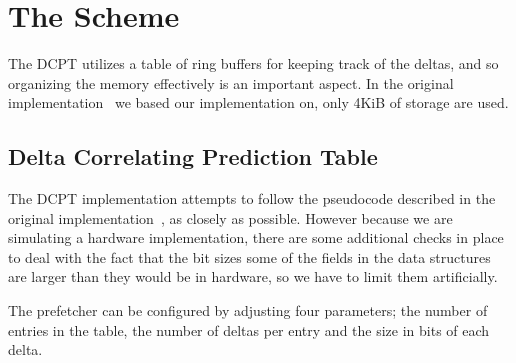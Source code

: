\section{The Scheme}


The DCPT utilizes a table of ring buffers for keeping track of the deltas, and
so organizing the memory effectively is an important aspect. In the original
implementation~\cite{dcpt} we based our implementation on, only 4KiB of storage
are used.


\subsection{Delta Correlating Prediction Table}

The DCPT implementation attempts to follow the pseudocode described in the
original implementation~\cite{dcpt}, as closely as possible. However because we
are simulating a hardware implementation, there are some additional checks in
place to deal
with the fact that the bit sizes some of the fields in the data
structures are larger than they would be in hardware, so we have to limit them
artificially.

The prefetcher can be configured by adjusting four parameters; the number of entries
in the table, the number of deltas per entry and the size in bits of each delta.

